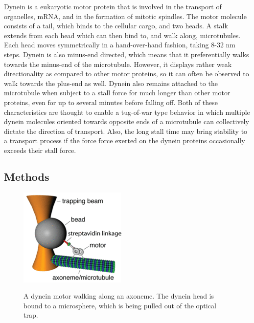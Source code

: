 \documentclass{../lab}
\begin{document}
Dynein is a eukaryotic motor protein that is involved in the transport of organelles, mRNA, and in the formation of mitotic spindles. The motor molecule consists of a tail, which binds to the cellular cargo, and two heads. A stalk extends from each head which can then bind to, and walk along, microtubules. Each head moves symmetrically in a hand-over-hand fashion, taking 8-32 nm steps. Dynein is also minus-end directed, which means that it preferentially walks towards the minus-end of the microtubule. However, it displays rather weak directionality as compared to other motor proteins, so it can often be observed to walk towards the plus-end as well. Dynein also remains attached to the microtubule when subject to a stall force for much longer than other motor proteins, even for up to several minutes before falling off. Both of these characteristics are thought to enable a tug-of-war type behavior in which multiple dynein molecules oriented towards opposite ends of a microtubule can collectively dictate the direction of transport. Also, the long stall time may bring stability to a transport process if the force force exerted on the dynein proteins occasionally exceeds their stall force.

\newpage

\subsection{Methods}

\begin{figure}[h]
    \centering
    \href{http://experimentationlab.berkeley.edu/sites/default/files/images/200px-Dynein_On_Axoneme.gif}{\includegraphics[width=0.3\linewidth]{images/200px-Dynein_On_Axoneme.png}}
    \caption{A dynein motor walking along an axoneme. The dynein head is bound to a microsphere, which is being pulled out of the optical trap.}
    \label{fig:200px-Dynein_On_Axoneme}
\end{figure}
\end{document}
